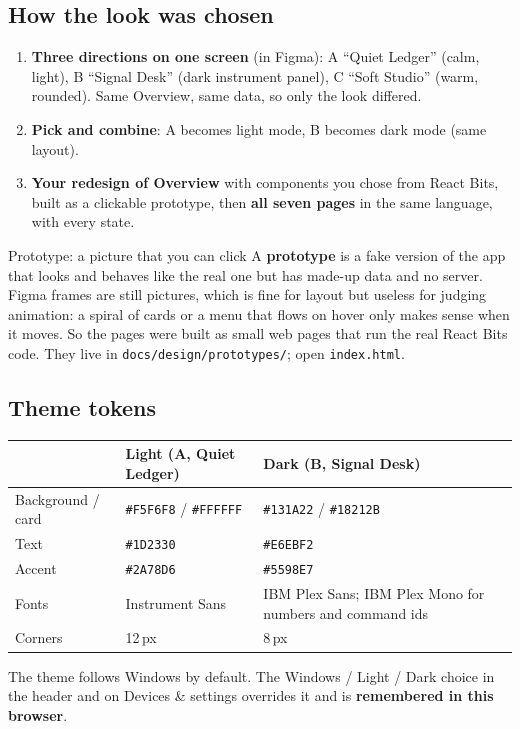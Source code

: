 \documentclass[11pt,a4paper]{article}
\begin{document}
\subsection{How the look was chosen}
\begin{enumerate}[nosep]
  \item \textbf{Three directions on one screen} (in Figma): A ``Quiet Ledger'' (calm, light),
        B ``Signal Desk'' (dark instrument panel), C ``Soft Studio'' (warm, rounded). Same Overview,
        same data, so only the look differed.
  \item \textbf{Pick and combine}: A becomes light mode, B becomes dark mode (same layout).
  \item \textbf{Your redesign of Overview} with components you chose from React Bits, built as a
        clickable prototype, then \textbf{all seven pages} in the same language, with every state.
\end{enumerate}

\begin{concept}{Prototype: a picture that you can click}
A \textbf{prototype} is a fake version of the app that looks and behaves like the real one but
has made-up data and no server. Figma frames are still pictures, which is fine for layout but
useless for judging animation: a spiral of cards or a menu that flows on hover only makes sense
when it moves. So the pages were built as small web pages that run the real React Bits code.
They live in \texttt{docs/design/prototypes/}; open \texttt{index.html}.
\end{concept}

\subsection{Theme tokens}
\begin{center}
\renewcommand{\arraystretch}{1.15}
\begin{tabularx}{\textwidth}{l X X}
\toprule
 & \textbf{Light (A, Quiet Ledger)} & \textbf{Dark (B, Signal Desk)} \\
\midrule
Background / card & \texttt{\#F5F6F8} / \texttt{\#FFFFFF} & \texttt{\#131A22} / \texttt{\#18212B} \\
Text              & \texttt{\#1D2330}                     & \texttt{\#E6EBF2} \\
Accent            & \texttt{\#2A78D6}                     & \texttt{\#5598E7} \\
Fonts             & Instrument Sans                        & IBM Plex Sans; IBM Plex Mono for numbers and command ids \\
Corners           & 12\,px                                 & 8\,px \\
\bottomrule
\end{tabularx}
\end{center}
The theme follows Windows by default. The Windows / Light / Dark choice in the header and on
Devices \& settings overrides it and is \textbf{remembered in this browser}.
\end{document}
